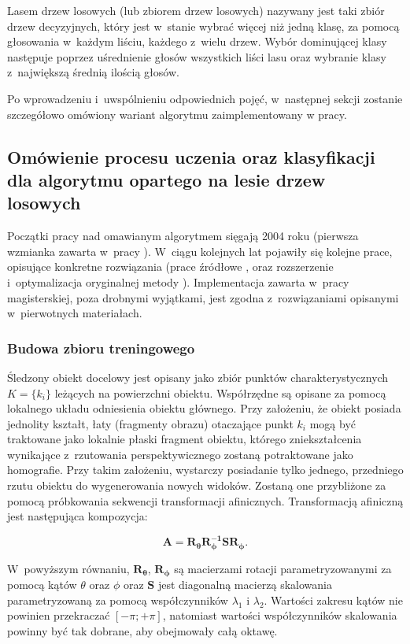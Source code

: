     Lasem drzew losowych (lub zbiorem drzew losowych) nazywany jest taki zbiór drzew decyzyjnych, który jest w~stanie wybrać więcej niż jedną klasę, za pomocą głosowania w~każdym liściu, każdego z~wielu drzew. Wybór dominującej klasy następuje poprzez uśrednienie głosów wszystkich liści lasu oraz wybranie klasy z~największą średnią ilością głosów.

    Po wprowadzeniu i~uwspólnieniu odpowiednich pojęć, w~następnej sekcji zostanie szczegółowo omówiony wariant algorytmu zaimplementowany w pracy.

    \subsection{Omówienie procesu uczenia oraz klasyfikacji dla algorytmu opartego na lesie drzew losowych}
    Początki pracy nad omawianym algorytmem sięgają 2004 roku (pierwsza wzmianka zawarta w~pracy \cite{RecognizingFeaturePointsUsingClassificationTrees04}). W~ciągu kolejnych lat pojawiły się kolejne prace, opisujące konkretne rozwiązania (prace źródłowe \cite{RealTimeRandomizedTrees05}, \cite{RandomizedTrees06} oraz rozszerzenie i~optymalizacja oryginalnej metody \cite{TwoStageRandomizedTrees11}). Implementacja zawarta w~pracy magisterskiej, poza drobnymi wyjątkami, jest zgodna z~rozwiązaniami opisanymi w~pierwotnych materiałach.

    \subsubsection{Budowa zbioru treningowego}
    Śledzony obiekt docelowy jest opisany jako zbiór punktów charakterystycznych $K = \{k_{i}\}$ leżących na powierzchni obiektu. Współrzędne są opisane za pomocą lokalnego układu odniesienia obiektu głównego. Przy założeniu, że obiekt posiada jednolity kształt, łaty (fragmenty obrazu) otaczające punkt $k_{i}$ mogą być traktowane jako lokalnie płaski fragment obiektu, którego zniekształcenia wynikające z~rzutowania perspektywicznego zostaną potraktowane jako homografie. Przy takim założeniu, wystarczy posiadanie tylko jednego, przedniego rzutu obiektu do wygenerowania nowych widoków. Zostaną one przybliżone za pomocą próbkowania sekwencji transformacji afinicznych. Transformacją afiniczną jest następująca kompozycja:

    \[
      \mathbf{A} = \mathbf{R_{\theta}}\mathbf{R_{\phi}^{-1}}\mathbf{S}\mathbf{R_{\phi}}.
    \]

    W~powyższym równaniu, $\mathbf{R_{\theta}}$, $\mathbf{R_{\phi}}$ są macierzami rotacji parametryzowanymi za pomocą kątów $\theta$ oraz $\phi$ oraz $\mathbf{S}$ jest diagonalną macierzą skalowania parametryzowaną za pomocą współczynników $\lambda_{1}$ i $\lambda_{2}$. Wartości zakresu kątów nie powinien przekraczać $[-\pi;+\pi]$, natomiast wartości współczynników skalowania powinny być tak dobrane, aby obejmowały całą oktawę.

